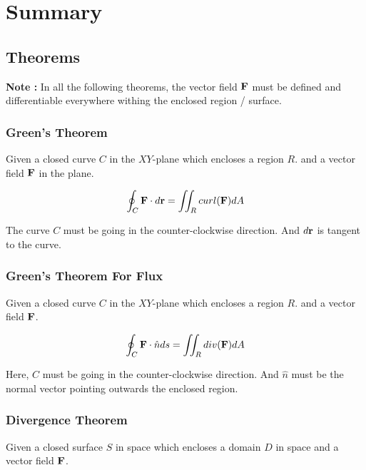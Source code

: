 

\chapter{Summary} 

\bigbreak

\section{Theorems}

{\bf Note : } In all the following theorems, 
the vector field ${\bf F}$ must be defined and differentiable everywhere withing the enclosed region / surface.

\subsection{Green's Theorem}

Given a closed curve $C$ in the $XY$-plane which encloses a region $R$.
and a vector field ${\bf F}$ in the plane. 

$$ \oint_C {\bf F} \cdot d{\bf r} = \iint_R curl({\bf F}) dA $$

The curve $C$ must be going in the counter-clockwise direction.
And $d{\bf r}$ is tangent to the curve.

\subsection{Green's Theorem For Flux}

Given a closed curve $C$ in the $XY$-plane which encloses a region $R$.
and a vector field ${\bf F}$.

$$ \oint_C {\bf F} \cdot \hat{n} ds = \iint_R div({\bf F}) dA $$

Here, $C$ must be going in the counter-clockwise direction.
And $\hat{n}$ must be the normal vector pointing outwards the enclosed region.

\subsection{Divergence Theorem}

Given a closed surface $S$ in space which encloses a domain $D$ in space
and a vector field ${\bf F}$.

